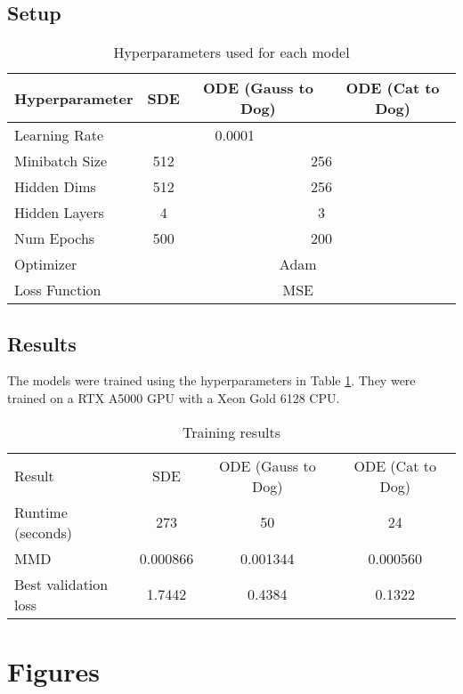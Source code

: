 \documentclass[conference,a4paper]{IEEEtran}
\begin{document}
\subsection{Setup}
\begin{table}
    \caption{Hyperparameters used for each model}
    \label{tab:hyp}
    \centering
    \begin{tabular}{lccc}
        \toprule
        Hyperparameter & SDE & ODE (Gauss to Dog) & ODE (Cat to Dog) \\
        \midrule
        Learning Rate & \multicolumn{2}{c}{0.0001} \\
        Minibatch Size & 512 & \multicolumn{2}{c}{256} \\
        Hidden Dims & 512 & \multicolumn{2}{c}{256}\\
        Hidden Layers & 4 & \multicolumn{2}{c}{3} \\
        Num Epochs & 500 & \multicolumn{2}{c}{200}\\
        Optimizer & \multicolumn{3}{c}{Adam} \\
        Loss Function & \multicolumn{3}{c}{MSE} \\
        \midrule
        \bottomrule
    \end{tabular}
\end{table}

\subsection{Results}
The models were trained using the hyperparameters in Table \ref{tab:hyp}. They were trained on a RTX A5000 GPU with a Xeon Gold 6128 CPU. 
\begin{table}
    \caption{Training results}
    \label{tab:mmd}
    \centering
    \begin{tabular}{lccc}
        \toprule
        Result & SDE & ODE (Gauss to Dog) & ODE (Cat to Dog) \\
        Runtime (seconds) & 273 & 50 & 24 \\
        MMD & 0.000866 & 0.001344 & 0.000560 \\
        Best validation loss & 1.7442 & 0.4384 & 0.1322 \\
        \midrule
        \bottomrule
    \end{tabular}
\end{table}

\section{Figures}
\end{document}
